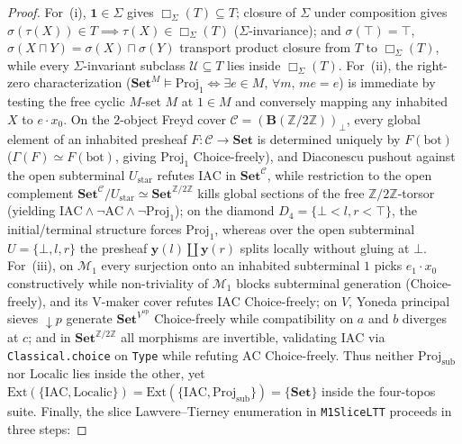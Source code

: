 \begin{proof}
For~(i), $\mathbf{1} \in \Sigma$ gives $\Box_\Sigma(T) \subseteq T$; closure of $\Sigma$ under composition gives $\sigma(\tau(X)) \in T \implies \tau(X) \in \Box_\Sigma(T)$ ($\Sigma$-invariance); and $\sigma(\top) = \top$, $\sigma(X \sqcap Y) = \sigma(X) \sqcap \sigma(Y)$ transport product closure from $T$ to $\Box_\Sigma(T)$, while every $\Sigma$-invariant subclass $\mathcal{U} \subseteq T$ lies inside $\Box_\Sigma(T)$. For~(ii), the right-zero characterization ($\mathbf{Set}^M \models \mathrm{Proj}_1 \iff \exists e \in M,\, \forall m,\, me = e$) is immediate by testing the free cyclic $M$-set $M$ at $1 \in M$ and conversely mapping any inhabited $X$ to $e \cdot x_0$. On the $2$-object Freyd cover $\mathcal{C} = (\mathbf{B}(\mathbb{Z}/2\mathbb{Z}))_\bot$, every global element of an inhabited presheaf $F : \mathcal{C} \to \mathbf{Set}$ is determined uniquely by $F(\mathrm{bot})$ ($\Gamma(F) \simeq F(\mathrm{bot})$, giving $\mathrm{Proj}_1$ Choice-freely), and Diaconescu pushout against the open subterminal $U_{\mathrm{star}}$ refutes $\mathrm{IAC}$ in $\mathbf{Set}^{\mathcal{C}}$, while restriction to the open complement $\mathbf{Set}^{\mathcal{C}}/U_{\mathrm{star}} \simeq \mathbf{Set}^{\mathbb{Z}/2\mathbb{Z}}$ kills global sections of the free $\mathbb{Z}/2\mathbb{Z}$-torsor (yielding $\mathrm{IAC} \wedge \neg\mathrm{AC} \wedge \neg\mathrm{Proj}_1$); on the diamond $D_4 = \{\bot < l, r < \top\}$, the initial/terminal structure forces $\mathrm{Proj}_1$, whereas over the open subterminal $U = \{\bot, l, r\}$ the presheaf $\mathbf{y}(l) \amalg \mathbf{y}(r)$ splits locally without gluing at $\bot$. For~(iii), on $\mathcal{M}_1$ every surjection onto an inhabited subterminal $1$ picks $e_1 \cdot x_0$ constructively while non-triviality of $\mathcal{M}_1$ blocks subterminal generation (Choice-freely), and its V-maker cover refutes $\mathrm{IAC}$ Choice-freely; on $V$, Yoneda principal sieves $\downarrow p$ generate $\mathbf{Set}^{V^{\mathrm{op}}}$ Choice-freely while compatibility on $a$ and $b$ diverges at $c$; and in $\mathbf{Set}^{\mathbb{Z}/2\mathbb{Z}}$ all morphisms are invertible, validating $\mathrm{IAC}$ via \texttt{Classical.choice} on \texttt{Type} while refuting $\mathrm{AC}$ Choice-freely. Thus neither $\mathrm{Proj}_{\mathrm{sub}}$ nor $\mathrm{Localic}$ lies inside the other, yet $\mathrm{Ext}(\{\mathrm{IAC}, \mathrm{Localic}\}) = \mathrm{Ext}(\{\mathrm{IAC}, \mathrm{Proj}_{\mathrm{sub}}\}) = \{\mathbf{Set}\}$ inside the four-topos suite. Finally, the slice Lawvere--Tierney enumeration in \texttt{M1SliceLTT} proceeds in three steps:

\end{proof}
